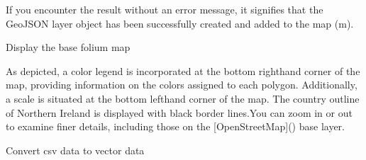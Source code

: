 \documentclass[letterpaper,10pt,english]{sphinxmanual}
\begin{document}
\begin{sphinxVerbatim}[commandchars=\\\{\}]
     
        
           
          
     
 
\end{sphinxVerbatim}

\sphinxAtStartPar
If you encounter the result  without an error message, it signifies that the GeoJSON layer object has been successfully created and added to the map (m).

\sphinxAtStartPar
Display the base folium map

\begin{sphinxVerbatim}[commandchars=\\\{\}]
\end{sphinxVerbatim}

\sphinxAtStartPar
As depicted, a color legend is incorporated at the bottom right\sphinxhyphen{}hand corner of the map, providing information on the colors assigned to each polygon. Additionally, a scale is situated at the bottom left\sphinxhyphen{}hand corner of the map. The country outline of Northern Ireland is displayed with black border lines.You can zoom in or out to examine finer details, including those on the {[}OpenStreetMap{]}() base layer.

\sphinxAtStartPar
{}

\sphinxAtStartPar
Convert csv data to vector data
\end{document}
